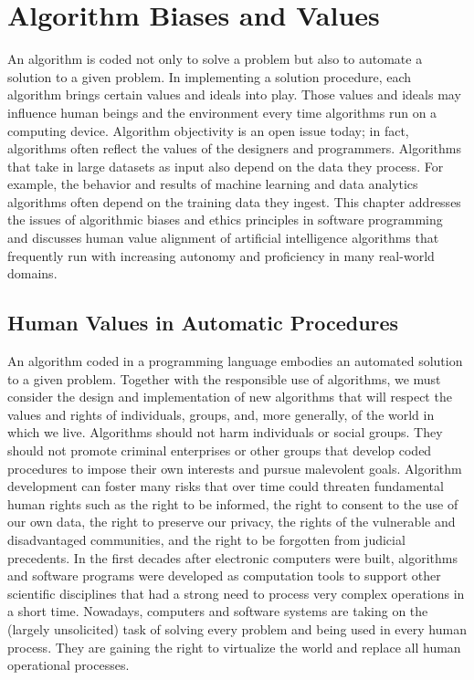 


%

\setcounter{chapter}{6}

\chapter{\label{chap:7}Algorithm Biases and Values}

\noindent An algorithm is coded not only to solve a problem but also to automate a solution to a given problem. In implementing a solution procedure, each algorithm brings certain values and ideals into play. Those values and ideals may influence human beings and the environment every time algorithms run on a computing device. Algorithm objectivity is an open issue today; in fact, algorithms often reflect the values of the designers and programmers. Algorithms that take in large datasets as input also depend on the data they process. For example, the behavior and results of machine learning and data analytics algorithms often depend on the training data they ingest. This chapter addresses the issues of algorithmic biases and ethics principles in software programming and discusses human value alignment of artificial intelligence algorithms that frequently run with increasing autonomy and proficiency in many real-world domains.

\section{\label{sec:7.1}Human Values in Automatic Procedures}

An algorithm coded in a programming language embodies an automated solution to a given problem. Together with the responsible use of algorithms, we must consider the design and implementation of new algorithms that will respect the values and rights of individuals, groups, and, more generally, of the world in which we live. Algorithms should not harm individuals or social groups. They should not promote criminal enterprises or other groups that develop coded procedures to impose their own interests and pursue malevolent goals. Algorithm development can foster many risks that over time could threaten fundamental human rights such as the right to be informed, the right to consent to the use of our own data, the right to preserve our privacy, the rights of the vulnerable and disadvantaged communities, and the right to be forgotten from judicial precedents. In the first decades after electronic computers were built, algorithms and software programs were developed as computation tools to support other scientific disciplines that had a strong need to process very complex operations in a short time. Nowadays, computers and software systems are taking on the (largely unsolicited) task of solving every problem and being used in every human process. They are gaining the right to virtualize the world and replace all human operational processes.

